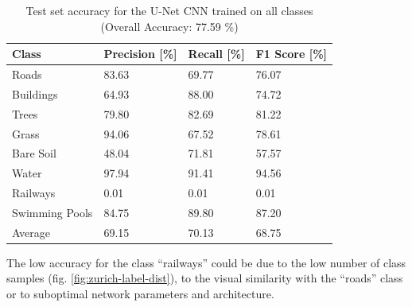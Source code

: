 \documentclass[10pt]{article}
\begin{document}
\begin{table}[H]
    \centering
    \begin{tabular}{llll}
    \toprule
    Class            & Precision [\%] & Recall [\%] & F1 Score [\%] \\ \midrule
    Roads          &      83.63 &   69.77 &     76.07 \\
    Buildings      &      64.93 &   88.00 &     74.72 \\
    Trees          &      79.80 &   82.69 &     81.22 \\
    Grass          &      94.06 &   67.52 &     78.61 \\
    Bare Soil      &      48.04 &   71.81 &     57.57 \\
    Water          &      97.94 &   91.41 &     94.56 \\
    Railways       &       0.01 &    0.01 &      0.01 \\
    Swimming Pools &      84.75 &   89.80 &     87.20 \\ \midrule
    Average        & 69.15     & 70.13  & 68.75  \\ \bottomrule
    \end{tabular}
    \caption{Test set accuracy for the U-Net \gls{CNN} trained on all classes (Overall Accuracy:  77.59 \%)}
    \label{table:zurich-cnn-acc-all}
\end{table}
The low accuracy for the class ``railways'' could be due to the low number of class samples (fig. \ref{fig:zurich-label-dist}), to the visual similarity with the ``roads'' class or to suboptimal network parameters and architecture. 
\end{document}
